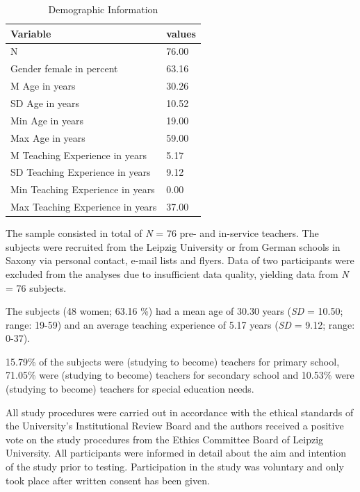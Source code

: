 \documentclass[
  man,floatsintext]{apa6}
\begin{document}
\begin{table}[h]

\begin{center}
\begin{threeparttable}

\caption{\label{tab:demographicstable}Demographic Information}

\tiny{

\begin{tabular}{ll}
\toprule
Variable & \multicolumn{1}{c}{values}\\
\midrule
N & 76.00\\
Gender female in percent & 63.16\\
M Age in years & 30.26\\
SD Age in years & 10.52\\
Min Age in years & 19.00\\
Max Age in years & 59.00\\
M Teaching Experience in years & 5.17\\
SD Teaching Experience in years & 9.12\\
Min Teaching Experience in years & 0.00\\
Max Teaching Experience in years & 37.00\\
\bottomrule
\end{tabular}

}

\end{threeparttable}
\end{center}

\end{table}

The sample consisted in total of \emph{N} = 76 pre- and in-service teachers. The subjects were recruited from the Leipzig University or from German schools in Saxony via personal contact, e-mail lists and flyers. Data of two participants were excluded from the analyses due to insufficient data quality, yielding data from \emph{N} = 76 subjects.

The subjects (48 women; 63.16 \%) had a mean age of 30.30 years (\emph{SD} = 10.50; range: 19-59) and an average teaching experience of 5.17 years (\emph{SD} = 9.12; range: 0-37).

15.79\% of the subjects were (studying to become) teachers for primary school, 71.05\% were (studying to become) teachers for secondary school and 10.53\% were (studying to become) teachers for special education needs.

All study procedures were carried out in accordance with the ethical standards of the University's Institutional Review Board and the authors received a positive vote on the study procedures from the Ethics Committee Board of Leipzig University. All participants were informed in detail about the aim and intention of the study prior to testing. Participation in the study was voluntary and only took place after written consent has been given.
\end{document}
